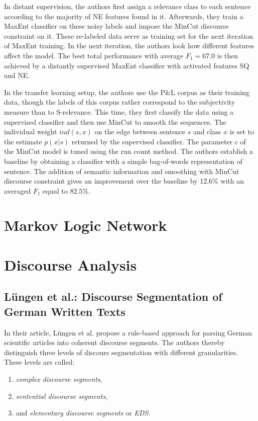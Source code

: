 \documentclass[a4paper,11pt]{article}
\begin{document}
In distant supervision, the authors first assign a relevance class to
each sentence according to the majority of NE features found in it.
Afterwards, they train a MaxEnt classifier on these noisy labels and
impose the MinCut discourse constraint on it.  These re-labeled data
serve as training set for the next iteration of MaxEnt training.  In
the next iteration, the authors look how different features affect the
model.  The best total performance with average $F_1 = 67.0$ is then
achieved by a distantly supervised MaxEnt classifier with activated
features SQ and NE.

In the transfer learning setup, the authors use the P\&L corpus as
their training data, though the labels of this corpus rather
correspond to the subjectivity measure than to S-relevance.  This
time, they first classify the data using a supervised classifier and
then use MinCut to smooth the sequences.  The individual weight
$ind(s,x)$ on the edge between sentence $s$ and class $x$ is set to
the estimate $p(x|s)$ returned by the supervised classifier.  The
parameter $c$ of the MinCut model is tuned using the run count method.
The authors establish a baseline by obtaining a classifier with a
simple bag-of-words representation of sentence.  The addition of
semantic information and smoothing with MinCut discourse constraint
gives an improvement over the baseline by 12.6\% with an averaged
$F_1$ equal to $82.5\%$.

\section{Markov Logic Network}

\section{Discourse Analysis}

\subsection{L\"ungen et al.: Discourse Segmentation of German Written Texts\cite{Luengen-06}}

In their article, L\"ungen et al. \cite{Luengen-06} propose a rule-based
approach for parsing German scientific articles into coherent discourse
segments.  The authors thereby distinguish three levels of discours
segmentation with different granularities.  These levels are called:
\begin{enumerate}
  \item \textit{complex discourse segments},\label{enum-cds}
  \item \textit{sentential discourse segments},\label{enum-sds}
  \item and \textit{elementary discourse segments} or \textit{EDS}.\label{enum-eds}
\end{enumerate}
\end{document}
